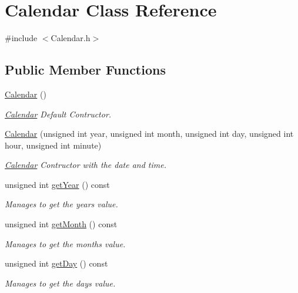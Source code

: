 \hypertarget{class_calendar}{}\section{Calendar Class Reference}
\label{class_calendar}


{\ttfamily \#include $<$Calendar.\+h$>$}

\subsection*{Public Member Functions}
\begin{DoxyCompactItemize}
\item 
\mbox{\label{class_calendar_a423ef27351bfa2309c6e2173bff61756}} 
\hyperlink{class_calendar_a423ef27351bfa2309c6e2173bff61756}{Calendar} ()
\begin{DoxyCompactList}\small\item\em \hyperlink{class_calendar}{Calendar} Default Contructor. \end{DoxyCompactList}\item 
\hyperlink{class_calendar_acb7511f11ca554eefcf4348df2d1e8b1}{Calendar} (unsigned int year, unsigned int month, unsigned int day, unsigned int hour, unsigned int minute)
\begin{DoxyCompactList}\small\item\em \hyperlink{class_calendar}{Calendar} Contructor with the date and time. \end{DoxyCompactList}\item 
unsigned int \hyperlink{class_calendar_aae56d627c0f61f70fdae96e816152bd7}{get\+Year} () const
\begin{DoxyCompactList}\small\item\em Manages to get the year\textquotesingle{}s value. \end{DoxyCompactList}\item 
unsigned int \hyperlink{class_calendar_a62220669e2fa95a58bb0e5a872aeaa53}{get\+Month} () const
\begin{DoxyCompactList}\small\item\em Manages to get the month\textquotesingle{}s value. \end{DoxyCompactList}\item 
unsigned int \hyperlink{class_calendar_aeb7e684bf63d0f500bd243d901dc20a8}{get\+Day} () const
\begin{DoxyCompactList}\small\item\em Manages to get the day\textquotesingle{}s value. \end{DoxyCompactList}\item 

\end{DoxyCompactItemize}

